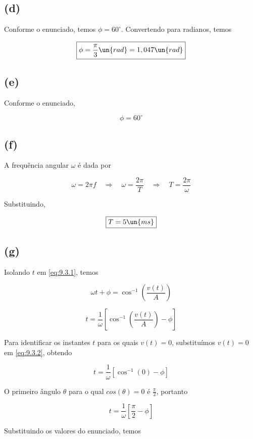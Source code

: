 \subsection*{(d)}

Conforme o enunciado, temos $\phi = 60^{\circ}$. Convertendo para radianos, temos

\[ \boxed{\phi = \frac{\pi}{3} \un{rad} = 1,047 \un{rad}}  \]

\subsection*{(e)}

Conforme o enunciado,

\[ \boxed{\phi = 60^{\circ}}  \]

\subsection*{(f)}

A frequência angular $\omega$ é dada por

\[ \omega = 2\pi f \quad \Rightarrow \quad \omega = \frac{2\pi}{T} \quad \Rightarrow \quad T = \frac{2\pi}{\omega}\]

Substituindo,

\[ \boxed{T = 5 \un{ms}}  \]

\subsection*{(g)}

Isolando $t$ em \eqref{eq:9.3.1}, temos

\[ \omega t + \phi = \cos^{-1}\left(\frac{v(t)}{A}\right) \]

\begin{equation}\label{eq:9.3.2}
    t = \frac{1}{\omega} \left[\cos^{-1}\left(\frac{v(t)}{A}\right) - \phi \right]
\end{equation}

Para identificar os instantes $t$ para os quais $v(t)=0$, substituímos $v(t)=0$ em \eqref{eq:9.3.2}, obtendo

\[  t = \frac{1}{\omega} \left[\cos^{-1}\left(0\right) - \phi \right] \]

O primeiro ângulo $\theta$ para o qual $cos(\theta) = 0$ é $\frac{\pi}{2}$, portanto  

\[  t = \frac{1}{\omega} \left[\frac{\pi}{2} - \phi \right] \]

Substituindo os valores do enunciado, temos

